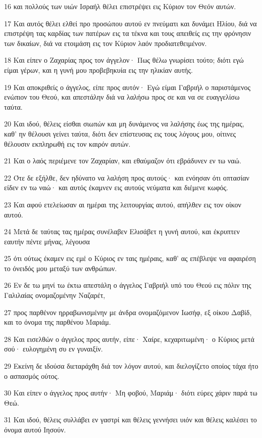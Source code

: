 \par 16 και πολλούς των υιών Ισραήλ θέλει επιστρέψει εις Κύριον τον Θεόν αυτών.
\par 17 Και αυτός θέλει ελθεί προ προσώπου αυτού εν πνεύματι και δυνάμει Ηλίου, διά να επιστρέψη τας καρδίας των πατέρων εις τα τέκνα και τους απειθείς εις την φρόνησιν των δικαίων, διά να ετοιμάση εις τον Κύριον λαόν προδιατεθειμένον.
\par 18 Και είπεν ο Ζαχαρίας προς τον άγγελον· Πως θέλω γνωρίσει τούτο; διότι εγώ είμαι γέρων, και η γυνή μου προβεβηκυία εις την ηλικίαν αυτής.
\par 19 Και αποκριθείς ο άγγελος, είπε προς αυτόν· Εγώ είμαι Γαβριήλ ο παριστάμενος ενώπιον του Θεού, και απεστάλην διά να λαλήσω προς σε και να σε ευαγγελίσω ταύτα.
\par 20 Και ιδού, θέλεις είσθαι σιωπών και μη δυνάμενος να λαλήσης έως της ημέρας, καθ' ην θέλουσι γείνει ταύτα, διότι δεν επίστευσας εις τους λόγους μου, οίτινες θέλουσιν εκπληρωθή εις τον καιρόν αυτών.
\par 21 Και ο λαός περιέμενε τον Ζαχαρίαν, και εθαύμαζον ότι εβράδυνεν εν τω ναώ.
\par 22 Ότε δε εξήλθε, δεν ηδύνατο να λαλήση προς αυτούς· και ενόησαν ότι οπτασίαν είδεν εν τω ναώ· και αυτός έκαμνεν εις αυτούς νεύματα και διέμενε κωφός.
\par 23 Και αφού ετελείωσαν αι ημέραι της λειτουργίας αυτού, απήλθεν εις τον οίκον αυτού.
\par 24 Μετά δε ταύτας τας ημέρας συνέλαβεν Ελισάβετ η γυνή αυτού, και έκρυπτεν εαυτήν πέντε μήνας, λέγουσα
\par 25 ότι ούτως έκαμεν εις εμέ ο Κύριος εν ταις ημέραις, καθ' ας επέβλεψε να αφαιρέση το όνειδός μου μεταξύ των ανθρώπων.
\par 26 Εν δε τω μηνί τω έκτω απεστάλη ο άγγελος Γαβριήλ υπό του Θεού εις πόλιν της Γαλιλαίας ονομαζομένην Ναζαρέτ,
\par 27 προς παρθένον ηρραβωνισμένην με άνδρα ονομαζόμενον Ιωσήφ, εξ οίκου Δαβίδ, και το όνομα της παρθένου Μαριάμ.
\par 28 Και εισελθών ο άγγελος προς αυτήν, είπε· Χαίρε, κεχαριτωμένη· ο Κύριος μετά σού· ευλογημένη συ εν γυναιξίν.
\par 29 Εκείνη δε ιδούσα διεταράχθη διά τον λόγον αυτού, και διελογίζετο οποίος τάχα ήτο ο ασπασμός ούτος.
\par 30 Και είπεν ο άγγελος προς αυτήν· Μη φοβού, Μαριάμ· διότι εύρες χάριν παρά τω Θεώ.
\par 31 Και ιδού, θέλεις συλλάβει εν γαστρί και θέλεις γεννήσει υιόν και θέλεις καλέσει το όνομα αυτού Ιησούν.
